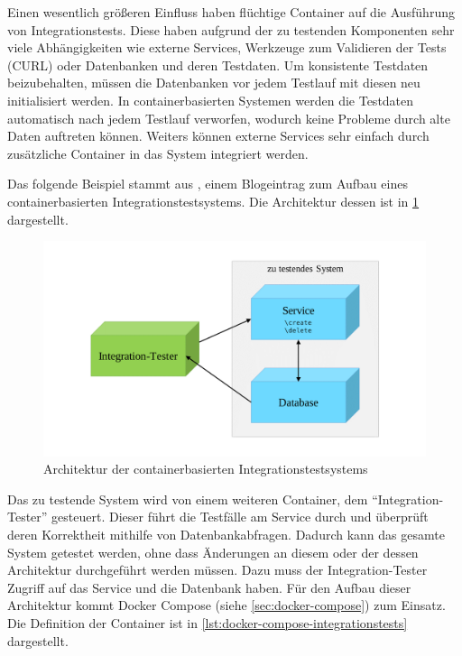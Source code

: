 Einen wesentlich größeren Einfluss haben flüchtige Container auf die Ausführung von Integrationstests.
Diese haben aufgrund der zu testenden Komponenten sehr viele Abhängigkeiten wie externe Services, Werkzeuge zum Validieren der Tests (CURL) oder Datenbanken und deren Testdaten.
Um konsistente Testdaten beizubehalten, müssen die Datenbanken vor jedem Testlauf mit diesen neu initialisiert werden.
In containerbasierten Systemen werden die Testdaten automatisch nach jedem Testlauf verworfen, wodurch keine Probleme durch alte Daten auftreten können.
Weiters können externe Services sehr einfach durch zusätzliche Container in das System integriert werden.

Das folgende Beispiel stammt aus \autocite{docker-integration-testing:online}, einem Blogeintrag zum Aufbau eines containerbasierten Integrationstestsystems. Die Architektur dessen ist in \cref{fig:containerbasierte-integrationstests} dargestellt.

\begin{figure}[htbp]
    \centering
    \includegraphics[width=0.7\linewidth,clip,trim=100 30 100 30]{images/containerbasierte-integrationstests}
    \caption{Architektur der containerbasierten Integrationstestsystems \autocite{docker-integration-testing:online}}
\label{fig:containerbasierte-integrationstests}
\end{figure}

\noindent Das zu testende System wird von einem weiteren Container, dem "`Integration-Tester"' gesteuert.
Dieser führt die Testfälle am Service durch und überprüft deren Korrektheit mithilfe von Datenbankabfragen.
Dadurch kann das gesamte System getestet werden, ohne dass Änderungen an diesem oder der dessen Architektur durchgeführt werden müssen.
Dazu muss der Integration-Tester Zugriff auf das Service und die Datenbank haben.
Für den Aufbau dieser Architektur kommt Docker Compose (siehe \cref{sec:docker-compose}) zum Einsatz.
Die Definition der Container ist in \cref{lst:docker-compose-integrationstests} dargestellt.

